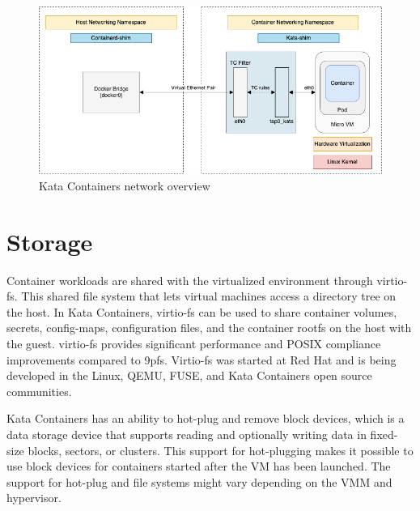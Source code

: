 \begin{figure}[ht]
  \begin{center}
    \includegraphics[width=13.5cm]{images/KataContainersNetwork.png}
    \caption{Kata Containers network overview \cite{KataContainersArchitecture}}
    \label{fig:KataContainersNetwork}
  \end{center}
\end{figure}

\section{Storage}

Container workloads are shared with the virtualized environment through virtio-fs. This shared file system that lets virtual machines access a directory tree on the host. In Kata Containers, virtio-fs can be used to share container volumes, secrets, config-maps, configuration files, and the container rootfs on the host with the guest. virtio-fs provides significant performance and POSIX compliance improvements compared to 9pfs. Virtio-fs was started at Red Hat and is being developed in the Linux, QEMU, FUSE, and Kata Containers open source communities. \cite{virtio-fs-Kata}\cite{virtio-fs}

Kata Containers has an ability to hot-plug and remove block devices, which is a data storage device that supports reading and optionally writing data in fixed-size blocks, sectors, or clusters. This support for hot-plugging makes it possible to use block devices for containers started after the VM has been launched. The support for hot-plug and file systems might vary depending on the VMM and hypervisor. \cite{KataContainersArchitecture}\cite{KataContainersVirtualization}


